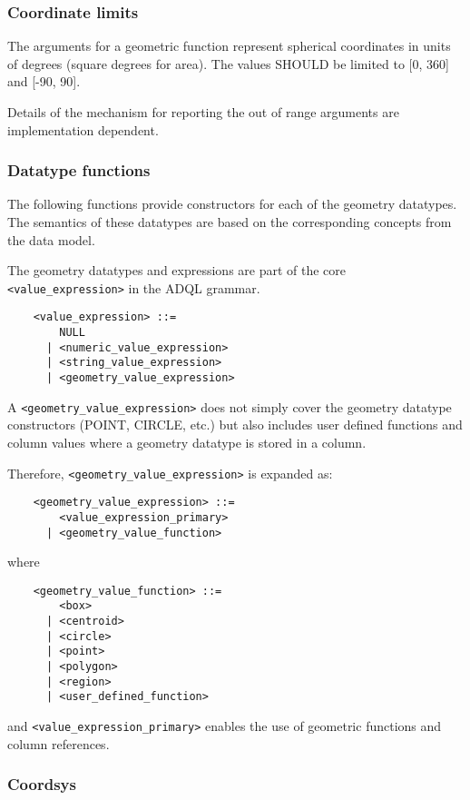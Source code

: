 \documentclass[11pt,a4paper]{ivoa}
\begin{document}
\subsubsection{Coordinate limits}
\label{sec:functions.geom.limits}

The arguments for a geometric function represent spherical coordinates
in units of degrees (square degrees for area).
The values SHOULD be limited to [0, 360] and [-90, 90].

Details of the mechanism for reporting the out of range arguments are
implementation dependent.

\subsubsection{Datatype functions}
\label{sec:functions.geom.type}

The following functions provide constructors for each of the geometry datatypes.
The semantics of these datatypes are based on the corresponding
concepts from the \STCSpec{} data model.

The geometry datatypes and expressions are part of the core \verb:<value_expression>:
in the ADQL grammar.

\begin{verbatim}
    <value_expression> ::=
        NULL
      | <numeric_value_expression>
      | <string_value_expression>
      | <geometry_value_expression>
\end{verbatim}

A \verb:<geometry_value_expression>: does not simply cover the geometry datatype
constructors (POINT, CIRCLE, etc.) but also includes user defined functions and
column values where a geometry datatype is stored in a column.

Therefore, \verb:<geometry_value_expression>: is expanded as:
\begin{verbatim}
    <geometry_value_expression> ::=
        <value_expression_primary>
      | <geometry_value_function>
\end{verbatim}
\noindent
where
\begin{verbatim}
    <geometry_value_function> ::=
        <box>
      | <centroid>
      | <circle>
      | <point>
      | <polygon>
      | <region>
      | <user_defined_function>
\end{verbatim}
and \verb:<value_expression_primary>: enables the use of geometric functions
and column references.

\subsubsection{Coordsys}
\label{sec:geom.coordsys.param}
\end{document}
